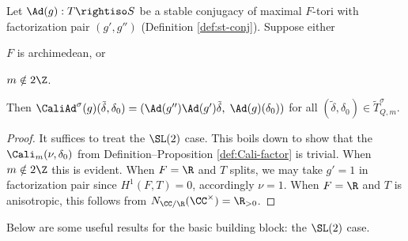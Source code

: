 \documentclass[a4paper,10pt]{article}
\begin{document}
\begin{proposition}\label{prop:CaliAd-simple}
	Let $\Ad(g): T \rightiso S$ be a stable conjugacy of maximal $F$-tori with factorization pair $(g', g'')$ (Definition \ref{def:st-conj}). Suppose either
	\begin{inparaenum}[(a)]
		\item $F$ is archimedean, or
		\item $m \notin 2\Z$.
	\end{inparaenum}
	Then $\CaliAd^\sigma(g)(\tilde{\delta}, \delta_0) = (\Ad(g'') \Ad(g')\tilde{\delta}, \; \Ad(g)(\delta_0))$ for all $(\tilde{\delta}, \delta_0) \in \tilde{T}^\sigma_{Q,m}$.
\end{proposition}
\begin{proof}
	It suffices to treat the $\SL(2)$ case. This boils down to show that the $\Cali_m(\nu, \delta_0)$ from Definition--Proposition \ref{def:Cali-factor} is trivial. When $m \notin 2\Z$ this is evident. When $F=\R$ and $T$ splits, we may take $g' = 1$ in factorization pair since $H^1(F,T)=0$, accordingly $\nu = 1$. When $F=\R$ and $T$ is anisotropic, this follows from $N_{\CC/\R}(\CC^\times) = \R_{>0}$.
\end{proof}

Below are some useful results for the basic building block: the $\SL(2)$ case. %
\end{document}

